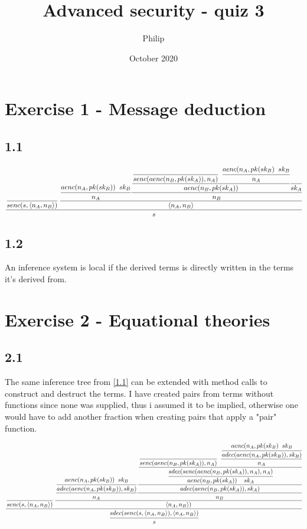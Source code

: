 \documentclass{article}
\title{Advanced security - quiz 3}
\author{Philip }
\date{October 2020}
\begin{document}
\maketitle

\section*{Exercise 1 - Message deduction}
\subsection*{1.1}\label{1.1}

$$
\cfrac{\cfrac{}{senc(s, \langle n_A, n_B \rangle)} \;
\cfrac{\cfrac{aenc(n_A, pk(sk_B)) \; \; sk_B}{n_A}
\cfrac{
\cfrac{\cfrac{}{senc(aenc(n_B, pk(sk_A)), n_A)} \; \; \cfrac{aenc(n_A, pk(sk_B) \; \; sk_B}{n_A}}
{aenc(n_B, pk(sk_A))} \cfrac{}{sk_A}}
{n_B}}
{\langle n_A, n_B \rangle}}
{s}
$$

\subsection*{1.2}
An inference system is local if the derived terms is directly written in the terms it's derived from.

\section*{Exercise 2 - Equational theories}

\subsection*{2.1}
The same inference tree from \ref{1.1} can be extended with method calls to construct and destruct the terms. I have created pairs from terms without functions since none was supplied, thus i assumed it to be implied, otherwise one would have to add another fraction when creating pairs that apply a "pair" function.


$$
\cfrac{
\cfrac{}{senc(s, \langle n_A, n_B \rangle)} \;
\cfrac{
\cfrac{\cfrac{aenc(n_A, pk(sk_B)) \; \; sk_B}{adec(aenc(n_A, pk(sk_B)), sk_B)}}{n_A}
\cfrac{\cfrac{
\cfrac{
\cfrac{}{senc(aenc(n_B, pk(sk_A)), n_A)} \; \; 
\cfrac{ \cfrac{aenc(n_A, pk(sk_B) \; \; sk_B}{adec(aenc(n_A, pk(sk_B)), sk_B)}}{n_A}}
{\cfrac{sdec(senc(aenc(n_B, pk(sk_A)), n_A), n_A)}{aenc(n_B, pk(sk_A)) \; \; \; \; sk_A}}
}{adec(aenc(n_B, pk(sk_A)), sk_A)}}
{n_B}
}
{\langle n_A, n_B \rangle)}
}
{\cfrac{sdec(senc(s, \langle n_A, n_B \rangle), \langle n_A, n_B \rangle)}{s}}
$$
\end{document}
